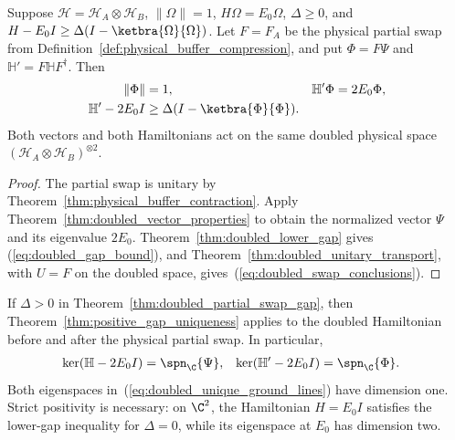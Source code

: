 \begin{theorem}
    \label{thm:doubled_partial_swap_gap}
    \leanok
    Suppose $\mathcal H=\mathcal H_A\otimes\mathcal H_B$,
    $\|\Omega\|=1$, $H\Omega=E_0\Omega$, $\Delta\ge0$, and
    $H-E_0I\ge\Delta(I-\ketbra{\Omega}{\Omega})$.
    Let $F=F_A$ be the physical partial swap from
    Definition~\ref{def:physical_buffer_compression}, and put
    $\Phi=F\Psi$ and $\mathbb H'=F\mathbb HF^\dagger$. Then
    \begin{align}
        \|\Phi\|&=1, & \mathbb H'\Phi&=2E_0\Phi,
        \label{eq:doubled_swap_conclusions}\\
        \mathbb H'-2E_0I&\ge\Delta(I-\ketbra{\Phi}{\Phi}). \notag
    \end{align}
    Both vectors and both Hamiltonians act on the same doubled physical
    space $(\mathcal H_A\otimes\mathcal H_B)^{\otimes2}$.
\end{theorem}
\begin{proof}\leanok
    The partial swap is unitary by
    Theorem~\ref{thm:physical_buffer_contraction}.
    Apply Theorem~\ref{thm:doubled_vector_properties} to obtain the
    normalized vector $\Psi$ and its eigenvalue $2E_0$.
    Theorem~\ref{thm:doubled_lower_gap} gives
    (\ref{eq:doubled_gap_bound}), and
    Theorem~\ref{thm:doubled_unitary_transport}, with $U=F$ on the
    doubled space, gives~(\ref{eq:doubled_swap_conclusions}).
\end{proof}

If $\Delta>0$ in Theorem~\ref{thm:doubled_partial_swap_gap}, then
Theorem~\ref{thm:positive_gap_uniqueness} applies to the doubled Hamiltonian
before and after the physical partial swap. In particular,
\begin{align}
    \ker(\mathbb H-2E_0I)&=\spn_{\C}\{\Psi\}, &
    \ker(\mathbb H'-2E_0I)&=\spn_{\C}\{\Phi\}.
    \label{eq:doubled_unique_ground_lines}
\end{align}
Both eigenspaces in~(\ref{eq:doubled_unique_ground_lines}) have dimension
one. Strict positivity is necessary: on $\C^2$, the Hamiltonian $H=E_0I$
satisfies the lower-gap inequality for $\Delta=0$, while its eigenspace
at $E_0$ has dimension two.

